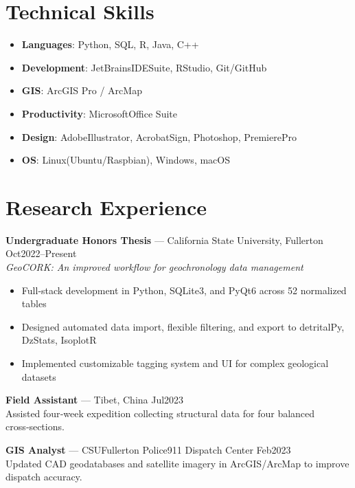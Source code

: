 \documentclass[10pt]{res}
\begin{document}
\section{Technical Skills}
\begin{itemize}[noitemsep, topsep=2pt]
  \item \textbf{Languages}: Python, SQL, R, Java, C++
  \item \textbf{Development}: JetBrainsIDESuite, RStudio, Git/GitHub
  \item \textbf{GIS}: ArcGIS Pro / ArcMap
  \item \textbf{Productivity}: MicrosoftOffice Suite
  \item \textbf{Design}: AdobeIllustrator, AcrobatSign, Photoshop, PremierePro
  \item \textbf{OS}: Linux(Ubuntu/Raspbian), Windows, macOS
\end{itemize}

\section{Research Experience}
\textbf{Undergraduate Honors Thesis} — California State University, Fullerton \hfill Oct2022–Present\\
\emph{GeoCORK: An improved workflow for geochronology data management}
\begin{itemize}[leftmargin=*, noitemsep]
  \item Full‑stack development in Python, SQLite3, and PyQt6 across 52 normalized tables
  \item Designed automated data import, flexible filtering, and export to detritalPy, DzStats, IsoplotR
  \item Implemented customizable tagging system and UI for complex geological datasets
\end{itemize}

\textbf{Field Assistant} — Tibet, China \hfill Jul2023\\
Assisted four‑week expedition collecting structural data for four balanced cross‑sections.

\textbf{GIS Analyst} — CSUFullerton Police911 Dispatch Center \hfill Feb2023\\
Updated CAD geodatabases and satellite imagery in ArcGIS/ArcMap to improve dispatch accuracy.
\end{document}
